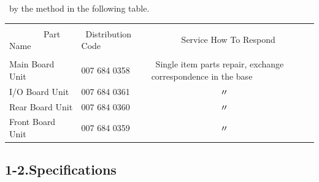 \documentclass[twoside,a4paper,12pt]{article}
\begin{document}
 \ by the method in the following table.\\[-2mm]

\small

\setlength{\arrayrulewidth}{0.5mm}
\setlength{\tabcolsep}{2mm}
\begin{tabular}{|p{55mm}|p{40mm}|p{62mm}|}
\hline
& & \\[-2mm]
\ \ \ \ \ \ \ \ Part Name & \ Distribution Code & \ \ \ \ \ \ \ Service How To Respond\\
\hline
& & \\[-4mm]
Main Board Unit & 007 684 0358 & \ Single item parts repair, exchange correspondence in the base\\
I/O Board Unit & 007 684 0361 & \ \ \ \ \ \ \ \ \ \ \ \ \ \ \ \ 〃\\
Rear Board Unit & 007 684 0360 & \ \ \ \ \ \ \ \ \ \ \ \ \ \ \ \ 〃\\
Front Board Unit & 007 684 0359 & \ \ \ \ \ \ \ \ \ \ \ \ \ \ \ \ 〃\\[4mm]
\hline
\end{tabular}

\newpage

\subsection*{1-2.Specifications}
\end{document}
